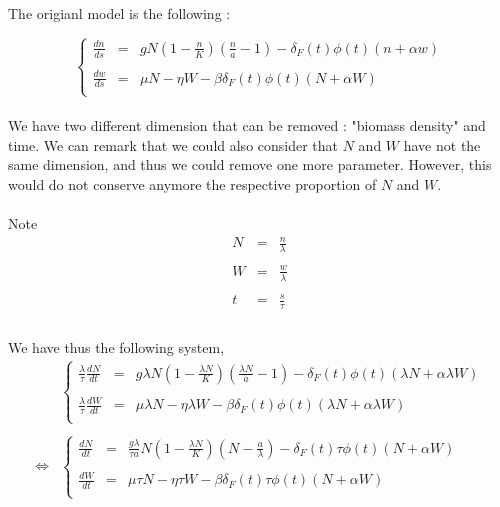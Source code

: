 \documentclass{article}
\begin{document}
\paragraph{}
The origianl model is the following :

\[
\left\lbrace
\begin{array}{rcl}
\frac{dn}{ds} & = & gN(1-\frac{n}{K})(\frac{n}{a}-1) - \delta_F(t)\phi(t)(n+\alpha w) \\
\\
\frac{dw}{ds} & = & \mu N - \eta W - \beta\delta_F(t)\phi(t)(N+\alpha W) \\
\end{array}
\right.
\]

\paragraph{}
We have two different dimension that can be removed : "biomass density" and time. We can remark that we could also consider that $N$ and $W$ have not the same dimension, and thus we could remove one more parameter. However, this would do not conserve anymore the respective proportion of $N$ and $W$.

\paragraph{}
Note
\[
\begin{array}{rcl}
N & = & \frac{n}{\lambda} \\
\\
W & = & \frac{w}{\lambda} \\
\\
t & = & \frac{s}{\tau} \\
\end{array}
\]

\paragraph{}
We have thus the following system,
\[
\begin{array}{rl}
& 

\left\lbrace
\begin{array}{rcl}
\frac{\lambda}{\tau}\frac{dN}{dt} & = & g\lambda N(1-\frac{\lambda N}{K})(\frac{\lambda N}{a}-1) - \delta_F(t)\phi(t)(\lambda N+\alpha \lambda W) \\
\\
\frac{\lambda}{\tau}\frac{dW}{dt} & = & \mu \lambda N -\eta \lambda W - \beta\delta_F(t)\phi(t)(\lambda N+\alpha \lambda W) \\
\end{array}
\right.
\\
\\
\Leftrightarrow & 
\left\lbrace
\begin{array}{rcl}
\frac{dN}{dt} & = & \frac{g \lambda}{\tau a} N(1-\frac{\lambda N}{K})(N-\frac{a}{\lambda}) - \delta_F(t)\tau\phi(t)(N+\alpha W) \\
\\
\frac{dW}{dt} & = & \mu \tau N -\eta \tau W - \beta\delta_F(t)\tau\phi(t)(N+\alpha W) \\
\end{array}
\right.
\end{array}
\]
\end{document}
